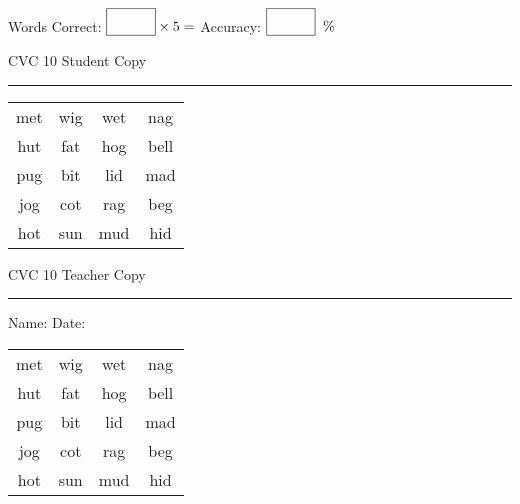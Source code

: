 \documentclass{memoir}
\begin{document}
\small

Words Correct: $\fbox{\phantom{\huge 100}} \times 5 = $ Accuracy: $\fbox{\phantom{\huge 100}}\;\; \%$ 

\vfill

\newpage


\footnotesize \noindent
CVC 10 \hfill Student Copy
\smallskip
\hrule

\Large

\setlength{\tabcolsep}{14pt}
\def\arraystretch{2}

{\selectfont


\begin{vplace}[0.5]
\begin{center}
\begin{tabular}{cccc}
met & wig & wet & nag \\
hut & fat & hog & bell \\
pug & bit & lid & mad \\
jog & cot & rag & beg \\
hot & sun & mud & hid \\
\end{tabular}
\end{center}
\end{vplace}

}

\newpage

\footnotesize \noindent
CVC 10 \hfill Teacher Copy
\smallskip
\hrule

\small

\vfill

\noindent
Name: \underline{\hspace{1.75in}} \hfill Date: \underline{\hspace{1in}}

\Large

{\selectfont


\begin{vplace}[0.5]
\begin{center}
\begin{tabular}{cccc}
met & wig & wet & nag \\
hut & fat & hog & bell \\
pug & bit & lid & mad \\
jog & cot & rag & beg \\
hot & sun & mud & hid \\
\end{tabular}
\end{center}
\end{vplace}



}
\end{document}
